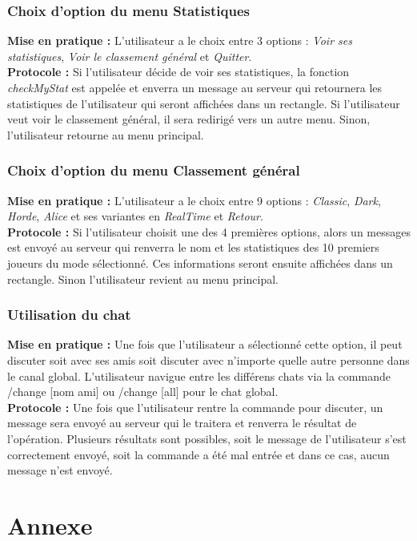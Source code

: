 \documentclass[10pt, a4paper]{article}
\begin{document}
\subsubsection{Choix d'option du menu Statistiques}
\textbf{Mise en pratique :} L'utilisateur a le choix entre 3 options : \textit{Voir ses statistiques}, \textit{Voir le classement général} et \textit{Quitter}.\\
\textbf{Protocole :} Si l'utilisateur décide de voir ses statistiques, la fonction \textit{checkMyStat} est appelée et enverra un message au serveur qui retournera les statistiques de l'utilisateur qui seront affichées dans un rectangle. Si l'utilisateur veut voir le classement général, il sera redirigé vers un autre menu. Sinon, l'utilisateur retourne au menu principal.\\

\subsubsection{Choix d'option du menu Classement général}
\textbf{Mise en pratique :} L'utilisateur a le choix entre 9 options : \textit{Classic}, \textit{Dark}, \textit{Horde}, \textit{Alice} et ses variantes en \textit{RealTime} et \textit{Retour}. \\
\textbf{Protocole :} Si l'utilisateur choisit une des 4 premières options, alors un messages est envoyé au serveur qui renverra le nom et les statistiques des 10 premiers joueurs du mode sélectionné. Ces informations seront ensuite affichées dans un rectangle. Sinon l'utilisateur revient au menu principal.\\


\subsubsection{Utilisation du chat}
\textbf{Mise en pratique :} Une fois que l'utilisateur a sélectionné cette option, il peut discuter soit avec ses amis soit discuter avec n'importe quelle autre personne dans le canal global. L'utilisateur navigue entre les différens chats via la commande /change [nom ami] ou /change [all] pour le chat global.\\
\textbf{Protocole :} Une fois que l'utilisateur rentre la commande pour discuter, un message sera envoyé au serveur qui le traitera et renverra le résultat de l'opération. Plusieurs résultats sont possibles, soit le message de l'utilisateur s'est correctement envoyé, soit la commande a été mal entrée et dans ce cas, aucun message n'est envoyé.\\



\section{Annexe}
\end{document}
